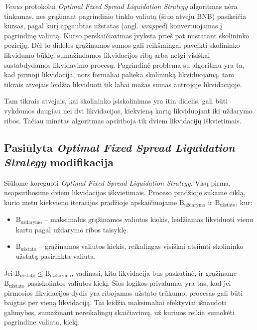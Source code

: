 \documentclass[]{VUMIFTemplateClass}
\begin{document}
\textit{Venus} protokolui \textit{Optimal Fixed Spread Liquidation Strategy} algoritmas nėra tinkamas, nes grąžinant pagrindinio tinklo valiutą (šiuo atveju BNB) pasikeičia kursas, pagal kurį apgaubtas užstatas (angl. \textit{wrapped}) konvertuojamas į pagrindinę valiutą. Kurso perskaičiavimas įvyksta prieš pat nustatant skolininko poziciją. Dėl to didelės grąžinamos sumos gali reikšmingai paveikti skolininko likvidumo būklę, sumažindamos likvidacijos ribą arba netgi visiškai sustabdydamos likvidavimo procesą. Pagrindinė problema su algoritmu yra ta, kad pirmoji likvidacija, nors formaliai palieka skolininką likviduojamą, tam tikrais atvejais leidžia likviduoti tik labai mažas sumas antrojoje likvidacijoje.

Tam tikrais atvejais, kai skolininko įsiskolinimas yra itin didelis, gali būti vykdomos daugiau nei dvi likvidacijos, kiekvieną kartą likviduojant iki uždarymo ribos. Tačiau minėtas algoritmas apsiriboja tik dviem likvidacijų iškvietimais.

\subsection{Pasiūlyta \textit{Optimal Fixed Spread Liquidation Strategy} modifikacija}

Siūlome koreguoti \textit{Optimal Fixed Spread Liquidation Strategy}. Visų pirma, neapsiribosime dviem likvidacijos iškvietimais. Proceso pradžioje sukame ciklą, kurio metu kiekvieno iteracijos pradžioje apskaičiuojame $\text{B}_{\text{uždarymo}}$ ir $\text{B}_{\text{užstato}}$, kur:

\begin{itemize}
\item $\text{B}_{\text{uždarymo}}$ – maksimalus grąžinamos valiutos kiekis, leidžiamas likviduoti vienu kartu pagal uždarymo ribos taisyklę.
\item $\text{B}_{\text{užstato}}$ – grąžinamos valiutos kiekis, reikalingas visiškai atsiimti skolininko užstatą pasirinkta valiuta.
\end{itemize}

Jei $\text{B}_{\text{užstato}} \leq \text{B}_{\text{uždarymo}}$, vadinasi, kita likvidacija bus paskutinė, ir grąžiname $\text{B}_{\text{užstato}}$ pasiskolintos valiutos kiekį. Šios logikos privalumas yra tas, kad jei pirmosios likvidacijos dydis yra ribojamas užstato trūkumo, procesas gali būti baigtas per vieną likvidaciją. Tai leidžia maksimaliai efektyviai išnaudoti galimybes, sumažinant nereikalingų skaičiavimų, už kuriuos reikia sumokėti pagrindine valiuta, kiekį.
\end{document}
